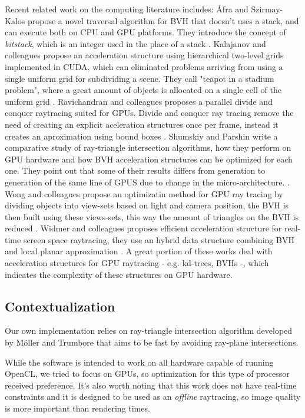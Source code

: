 \documentclass[a4paper]{sbgames}               %
\begin{document}
Recent related work on the computing literature includes: Áfra and
Szirmay-Kalos propose a novel traversal algorithm for BVH that doesn't
uses a stack, and can execute both on CPU and GPU platforms. They
introduce the concept of \emph{bitstack}, which is an integer used in
the place of a stack \cite{Afra}. Kalajanov and colleagues propose an
acceleration structure using hierarchical two-level grids implemented
in CUDA, which can eliminated problems arriving from using a single
uniform grid for subdividing a scene. They call "teapot in a stadium
problem", where a great amount of objects is allocated on a single
cell of the uniform grid \cite{Kalojanov}. Ravichandran and colleagues
proposes a parallel divide and conquer raytracing suited for
GPUs. Divide and conquer ray tracing remove the need of creating an
explicit aceleration structures once per frame, instead it creates an
aproximation using bound boxes \cite{Ravichandran}. Shumskiy and
Parshin write a comparative study of ray-triangle intersection
algorithms, how they perform on GPU hardware and how BVH acceleration
structures can be optimized for each one. They point out that some of
their results differs from generation to generation of the same line
of GPUS due to change in the micro-architecture.
\cite{Shumskiy}. Wong and colleagues propose an optimizatin method for
GPU ray tracing by dividing objects into view-sets based on light and
camera position, the BVH is then built using these views-sets, this
way the amount of triangles on the BVH is reduced \cite{Wong}. Widmer
and colleagues proposes efficient acceleration structure for real-time
screen space raytracing, they use an hybrid data structure combining
BVH and local planar approximation \cite{Widmer}. A great portion of
these works deal with acceleration structures for GPU raytracing -
e.g. kd-trees, BVHs -, which indicates the complexity of these
structures on GPU hardware.


\subsection{Contextualization}

Our own implementation relies on ray-triangle intersection algorithm
developed by Möller and Trumbore that aims to be fast by avoiding
ray-plane intersections\cite{moller}.

While the software is intended to work on all hardware capable of
running OpenCL, we tried to focus on GPUs, so optimization for this
type of processor received preference. It's also worth noting that
this work does not have real-time constraints and it is designed to be
used as an \emph{offline} raytracing, so image quality is more
important than rendering times.
\end{document}

